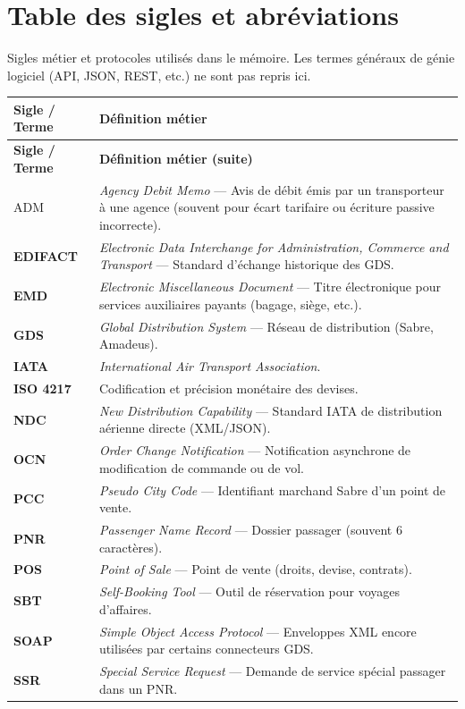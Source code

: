 \chapter*{Table des sigles et abréviations}

\vspace{0.2cm}
Sigles métier et protocoles utilisés dans le mémoire. Les termes généraux de génie logiciel (API, JSON, REST, etc.) ne sont pas repris ici.

\vspace{0.4cm}
{\small
\renewcommand{\arraystretch}{1.3}
\begin{longtable}{>{\columncolor{CobaltBlue!5}\bfseries\color{NavyBlue}}p{2.6cm} p{12.2cm}}
\hline
\rowcolor{CobaltBlue!12}
\textbf{\color{NavyBlue}Sigle / Terme} & \textbf{\color{NavyBlue}Définition métier} \\
\hline
\endfirsthead

\hline
\rowcolor{CobaltBlue!12}
\textbf{\color{NavyBlue}Sigle / Terme} & \textbf{\color{NavyBlue}Définition métier (suite)} \\
\hline
\endhead

\hline
\endfoot

ADM & \textit{Agency Debit Memo} — Avis de débit émis par un transporteur à une agence (souvent pour écart tarifaire ou écriture passive incorrecte). \\
EDIFACT & \textit{Electronic Data Interchange for Administration, Commerce and Transport} — Standard d'échange historique des GDS. \\
EMD & \textit{Electronic Miscellaneous Document} — Titre électronique pour services auxiliaires payants (bagage, siège, etc.). \\
GDS & \textit{Global Distribution System} — Réseau de distribution (Sabre, Amadeus). \\
IATA & \textit{International Air Transport Association}. \\
ISO 4217 & Codification et précision monétaire des devises. \\
NDC & \textit{New Distribution Capability} — Standard IATA de distribution aérienne directe (XML/JSON). \\
OCN & \textit{Order Change Notification} — Notification asynchrone de modification de commande ou de vol. \\
PCC & \textit{Pseudo City Code} — Identifiant marchand Sabre d'un point de vente. \\
PNR & \textit{Passenger Name Record} — Dossier passager (souvent 6 caractères). \\
POS & \textit{Point of Sale} — Point de vente (droits, devise, contrats). \\
SBT & \textit{Self-Booking Tool} — Outil de réservation pour voyages d'affaires. \\
SOAP & \textit{Simple Object Access Protocol} — Enveloppes XML encore utilisées par certains connecteurs GDS. \\
SSR & \textit{Special Service Request} — Demande de service spécial passager dans un PNR. \\
\end{longtable}
}
